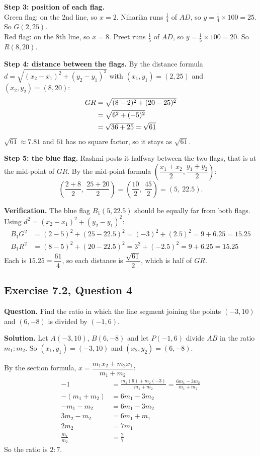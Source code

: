 \textbf{Step 3: position of each flag.}\\
Green flag: on the 2nd line, so $x=2$. Niharika runs $\frac14$ of $AD$, so $y=\frac14\times100=25$. So $G(2,25)$.\\
Red flag: on the 8th line, so $x=8$. Preet runs $\frac15$ of $AD$, so $y=\frac15\times100=20$. So $R(8,20)$.

\textbf{Step 4: distance between the flags.} By the distance formula $d=\sqrt{(x_2-x_1)^2+(y_2-y_1)^2}$ with $(x_1,y_1)=(2,25)$ and $(x_2,y_2)=(8,20)$:
\begin{align*}
\distn{GR}{2}{25}{8}{20}
\end{align*}
$\sqrt{61}\approx7.81$ and $61$ has no square factor, so it stays as $\sqrt{61}$.

\textbf{Step 5: the blue flag.} Rashmi posts it halfway between the two flags, that is at the mid-point of $GR$. By the mid-point formula $\left(\dfrac{x_1+x_2}{2},\dfrac{y_1+y_2}{2}\right)$:
\[
\left(\frac{2+8}{2},\ \frac{25+20}{2}\right)=\left(\frac{10}{2},\ \frac{45}{2}\right)=(5,\ 22.5).
\]

\textbf{Verification.} The blue flag $B_1(5,22.5)$ should be equally far from both flags. Using $d^2=(x_2-x_1)^2+(y_2-y_1)^2$:
\begin{align*}
B_1G^2&=(2-5)^2+(25-22.5)^2=(-3)^2+(2.5)^2=9+6.25=15.25\\
B_1R^2&=(8-5)^2+(20-22.5)^2=3^2+(-2.5)^2=9+6.25=15.25
\end{align*}
Each is $15.25=\dfrac{61}{4}$, so each distance is $\dfrac{\sqrt{61}}{2}$, which is half of $GR$.


\subsection*{Exercise 7.2, Question 4}
\textbf{Question.} Find the ratio in which the line segment joining the points $(-3,10)$ and $(6,-8)$ is divided by $(-1,6)$.

\textbf{Solution.} Let $A(-3,10)$, $B(6,-8)$ and let $P(-1,6)$ divide $AB$ in the ratio $m_1:m_2$. So $(x_1,y_1)=(-3,10)$ and $(x_2,y_2)=(6,-8)$.

By the section formula, $x=\dfrac{m_1x_2+m_2x_1}{m_1+m_2}$:
\begin{align*}
-1&=\frac{m_1(6)+m_2(-3)}{m_1+m_2}=\frac{6m_1-3m_2}{m_1+m_2}\\
-(m_1+m_2)&=6m_1-3m_2\\
-m_1-m_2&=6m_1-3m_2\\
3m_2-m_2&=6m_1+m_1\\
2m_2&=7m_1\\
\frac{m_1}{m_2}&=\frac27
\end{align*}
So the ratio is $2:7$.

